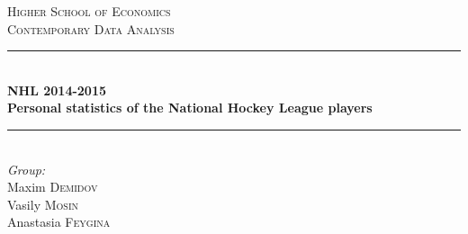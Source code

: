 \newcommand{\HRule}{\rule{\linewidth}{0.5mm}} %

\begin{center} %


\textsc{\LARGE Higher School of Economics}\\[1.5cm] %
\textsc{\LARGE Contemporary Data Analysis}\\[1.5cm] %


\HRule \\[0.7cm]
{ \huge \bfseries NHL 2014-2015\\[0.2cm]
Personal statistics of the National Hockey League players}\\[0.5cm] %
\HRule \\[1.5cm]


\Large \emph{Group:}\\[0.2cm]
Maxim \textsc{Demidov}\\[0.2cm] %
Vasily \textsc{Mosin}\\[0.2cm] %
Anastasia \textsc{Feygina}\\[0.2cm] %


\end{center} %

\newpage
